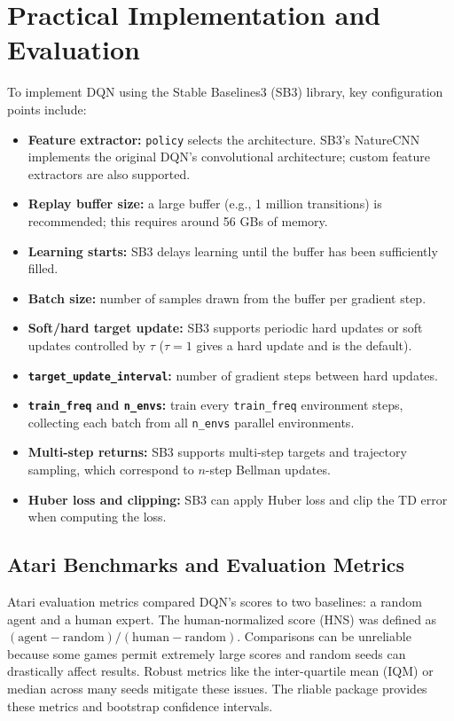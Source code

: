 \documentclass[11pt,a4paper]{article}
\newcommand{\nexttopic}{\clearpage}
\begin{document}
\nexttopic
\section{Practical Implementation and Evaluation}

To implement DQN using the Stable Baselines3 (SB3) library, key configuration
points include:
\begin{itemize}
 \item \textbf{Feature extractor:} \texttt{policy} selects the architecture.
 SB3's NatureCNN implements the original DQN's convolutional architecture;
 custom feature extractors are also supported.
 \item \textbf{Replay buffer size:} a large buffer (e.g., 1 million
 transitions) is recommended; this requires around 56 GBs of memory.
 \item \textbf{Learning starts:} SB3 delays learning until the buffer has
 been sufficiently filled.
 \item \textbf{Batch size:} number of samples drawn from the buffer per
 gradient step.
 \item \textbf{Soft/hard target update:} SB3 supports periodic hard updates
 or soft updates controlled by $\tau$ ($\tau=1$ gives a hard update and is the default).
 \item \textbf{\texttt{target\_update\_interval}:} number of gradient steps between hard updates.
 \item \textbf{\texttt{train\_freq} and \texttt{n\_envs}:} train every
 \texttt{train\_freq} environment steps, collecting each batch from all
 \texttt{n\_envs} parallel environments.
 \item \textbf{Multi-step returns:} SB3 supports multi-step targets and
 trajectory sampling, which correspond to $n$-step Bellman updates.
 \item \textbf{Huber loss and clipping:} SB3 can apply Huber loss and clip
 the TD error when computing the loss.
\end{itemize}

\subsection{Atari Benchmarks and Evaluation Metrics}
Atari evaluation metrics compared DQN's scores to two baselines: a random
agent and a human expert. The human-normalized score (HNS) was defined as
$(\mathrm{agent}-\mathrm{random})/(\mathrm{human}-\mathrm{random})$.
Comparisons can be unreliable because some games permit extremely large scores
and random seeds can drastically affect results. Robust metrics like the
inter-quartile mean (IQM) or median across many seeds mitigate these issues.
The rliable package provides these metrics and bootstrap confidence intervals.
\end{document}
